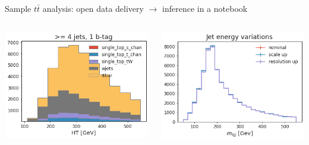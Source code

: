 \documentclass[aspectratio=169]{beamer}
\begin{document}
\begin{frame}{Sample $t\bar{t}$ analysis: open data delivery $\to$ inference in a notebook}
\begin{columns}
\begin{columns}
\includegraphics[width=\linewidth]{PLOTS/gac-ttbar-plot-0.png}

\vfill
\includegraphics[width=\linewidth]{PLOTS/gac-ttbar-plot-3.png}


\end{columns}
\end{columns}
\end{frame}
\end{document}
